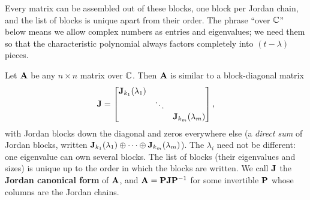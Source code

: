 Every matrix can be assembled out of these blocks, one block per Jordan chain, and the
list of blocks is unique apart from their order. The phrase ``over $\mathbb{C}$'' below means we
allow complex numbers as entries and eigenvalues; we need them so that the characteristic
polynomial always factors completely into $(t-\lambda)$ pieces.

\begin{theorem}
\label{ch28:thm-jordan}
Let $\mathbf{A}$ be any $n\times n$ matrix over $\mathbb{C}$. Then $\mathbf{A}$ is similar to a
block-diagonal matrix
\[
\mathbf{J} = \begin{bmatrix}
\mathbf{J}_{k_1}(\lambda_1) & & \\
 & \ddots & \\
 & & \mathbf{J}_{k_m}(\lambda_m)
\end{bmatrix},
\]
with Jordan blocks down the diagonal and zeros everywhere else (a \emph{direct sum} of
Jordan blocks, written $\mathbf{J}_{k_1}(\lambda_1)\oplus\cdots\oplus\mathbf{J}_{k_m}(\lambda_m)$).
The $\lambda_i$ need not be different: one eigenvalue can own several blocks. The list of
blocks (their eigenvalues and sizes) is unique up to the order in which the blocks are written. We call $\mathbf{J}$ the
\textbf{Jordan canonical form} of $\mathbf{A}$, and $\mathbf{A}=\mathbf{P}\mathbf{J}\mathbf{P}^{-1}$ for
some invertible $\mathbf{P}$ whose columns are the Jordan chains.
\end{theorem}

